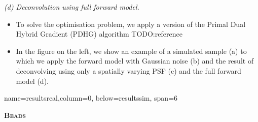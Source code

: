 \documentclass[a0paper,portrait,fontscale=0.35]{baposter}
\newcommand{\mycaption}[1]{
  {
    \smaller
    \emph{#1}
  }
}
\theoremstyle{plain}
\theoremstyle{plain}
\theoremstyle{definition}
\theoremstyle{plain}
\theoremstyle{definition}
\begin{document}
\begin{poster}
{\begin{minipage}[t]{0.49\textwidth}
\begin{minipage}[t]{0.49\textwidth}

        \vspace{-0.3em}
        \mycaption{
          (d) Deconvolution using full forward model.
        }
      \end{minipage}
    \end{minipage}
    \hspace{1.5em}
    \begin{minipage}[t]{0.45\textwidth}
      \begin{itemize}
        \item To solve the optimisation problem, we apply a version
          of the Primal Dual Hybrid Gradient (PDHG) algorithm TODO:reference

        \item In the figure on the left, we show an example of a simulated sample (a) 
          to which we apply the forward model with Gaussian noise (b)
          and the result of deconvolving using only a spatially varying
          PSF (c) and the full forward model (d).
      \end{itemize}
    \end{minipage}
}

{name=resultsreal,column=0, below=resultssim, span=6}{
  \begin{minipage}[t]{0.51\textwidth} 
    \begin{center}
      \larger
      \textbf{\textsc{Beads}}
    \end{center}


\end{minipage}}
\end{poster}
\end{document}
